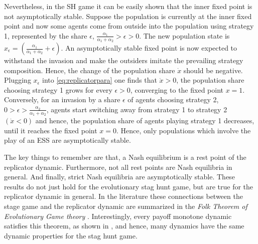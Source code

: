 Nevertheless, in the SH game it can be easily shown that the inner
fixed point is not asymptotically stable.
Suppose the population is currently at the inner fixed point and now 
some agents come from outside into the population
using strategy 1, represented by the share $\epsilon$,
$\frac{\alpha_1}{\alpha_1+\alpha_2}>\epsilon > 0$.
The new population state is 
$x_{\epsilon}=\left(\frac{\alpha_1}{\alpha_1+\alpha_2} + \epsilon\right)$.
An asymptotically stable fixed point is now expected to withstand the invasion
and make the outsiders imitate the prevailing strategy composition. Hence, 
the change of the population share $\dot{x}$ should be negative.
Plugging $x_{\epsilon}$ into
\eqref{eq:replicatorpara} one finds that $\dot{x} >0$, the population share
choosing strategy 1 grows for every $\epsilon >0$, converging to the 
fixed point $x = 1$. Conversely, for an invasion by a share $\epsilon$ 
of agents
choosing strategy 2, $0 > \epsilon > \frac{\alpha_2}{\alpha_1+\alpha_2}$,
agents start switching away from strategy 1 to strategy 2 $(\dot{x} < 0)$ 
and hence, the population share of agents playing strategy 1 
decreases, until it reaches the 
fixed point $x=0$. 
Hence, only populations which involve the play of an ESS are asymptotically 
stable.

The key things to remember are that, a Nash equilibrium is a rest point of
the replicator dynamic. Furthermore, not all rest points are 
Nash equilibria in general. And finally, strict Nash equilibria 
are asymptotically stable. These results do not just hold for
the evolutionary stag hunt game, but are true for the replicator dynamic
in general. In the literature these connections between the stage game
and the replicator dynamic are summarized in the
\textit{Folk Theorem of Evolutionary Game theory} 
\parencite[25]{szabo_evolutionary_2007}. Interestingly, every payoff
monotone dynamic satisfies this theorem, as shown in 
\textcite{hofbauer_evolutionary_2003}, and hence, many dynamics have the same
dynamic properties for the stag hunt game. 

